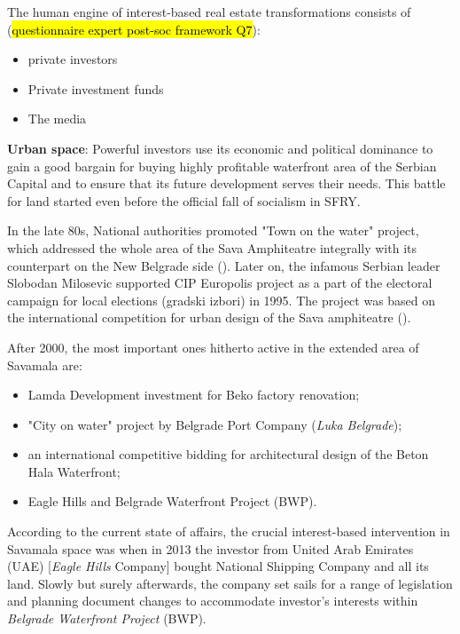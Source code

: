 \documentclass[11pt]{report}
\begin{document}
\begin{itemize}
The human engine of interest-based real estate transformations consists of (\hl{questionnaire expert post-soc framework Q7}):

\begin{itemize}
\item private investors
\item Private investment funds
\item The media
\end{itemize}

\textbf{Urban space}:
Powerful investors use its economic and political dominance to gain a good bargain for buying highly profitable waterfront area of the Serbian Capital and to ensure that its future development serves their needs. This battle for land started even before the official fall of socialism in SFRY.

In the late 80s, National authorities promoted "Town on the water" project, which addressed the whole area of the Sava Amphiteatre integrally with its counterpart on the New Belgrade side (\cite{Program Savskkog amfiteatra 1}).
Later on, the infamous Serbian leader Slobodan Milosevic supported CIP Europolis project as a part of the electoral campaign for local elections (gradski izbori) in 1995.
The project was based on the international competition for urban design of the Sava amphiteatre (\cite{Program Savskkog amfiteatra 1}).

After 2000, the most important ones hitherto active in the extended area of Savamala are:

\begin{itemize}
\item Lamda Development investment for Beko factory renovation;
\item "City on water" project by Belgrade Port Company (\textit{Luka Belgrade});
\item an international competitive bidding for architectural design of the Beton Hala Waterfront;
\item Eagle Hills and Belgrade Waterfront Project (BWP).
\end{itemize}

According to the current state of affairs, the crucial interest-based intervention in Savamala space was when in 2013 the investor from United Arab Emirates (UAE) [\textit{Eagle Hills} Company] bought National Shipping Company and all its land. Slowly but surely afterwards, the company set sails for a range of legislation and planning document changes to accommodate investor's interests within \textit{Belgrade Waterfront Project} (BWP).


\end{itemize}
\end{document}
